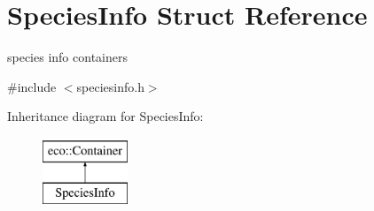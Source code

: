 \hypertarget{structSpeciesInfo}{
\section{SpeciesInfo Struct Reference}
\label{structSpeciesInfo}
}


species info containers  




{\ttfamily \#include $<$speciesinfo.h$>$}

Inheritance diagram for SpeciesInfo:\begin{figure}[H]
\begin{center}
\leavevmode
\includegraphics[height=2.000000cm]{structSpeciesInfo}
\end{center}
\end{figure}

